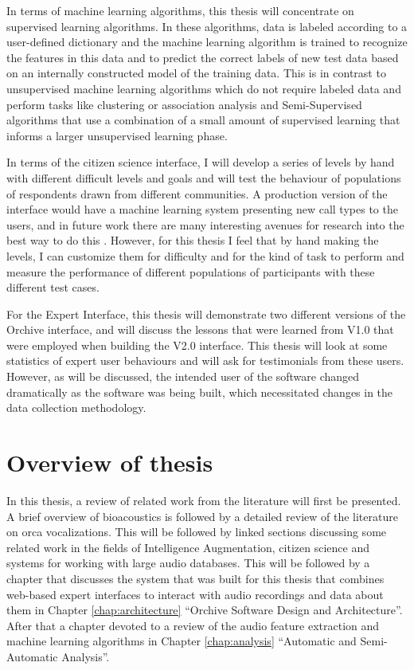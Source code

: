 In terms of machine learning algorithms, this thesis will concentrate
on supervised learning algorithms.  In these algorithms, data is
labeled according to a user-defined dictionary and the machine
learning algorithm is trained to recognize the features in this data
and to predict the correct labels of new test data based on an
internally constructed model of the training data.  This is in
contrast to unsupervised machine learning algorithms which do not
require labeled data and perform tasks like clustering or association
analysis and Semi-Supervised algorithms \cite{chapelle2006} that use a
combination of a small amount of supervised learning that informs a
larger unsupervised learning phase.

In terms of the citizen science interface, I will develop a series of
levels by hand with different difficult levels and goals and will test
the behaviour of populations of respondents drawn from different
communities.  A production version of the interface would have a
machine learning system presenting new call types to the users, and in
future work there are many interesting avenues for research into the
best way to do this \cite{chen2013optimistic}.  However, for this
thesis I feel that by hand making the levels, I can customize them
for difficulty and for the kind of task to perform and measure the
performance of different populations of participants with these
different test cases.

For the Expert Interface, this thesis will demonstrate two different
versions of the Orchive interface, and will discuss the lessons that
were learned from V1.0 that were employed when building the V2.0
interface.  This thesis will look at some statistics of expert user
behaviours and will ask for testimonials from these users.  However,
as will be discussed, the intended user of the software changed
dramatically as the software was being built, which necessitated
changes in the data collection methodology.

\section{Overview of thesis}
\label{section:introduction:overview}

In this thesis, a review of related work from the literature will
first be presented.  A brief overview of bioacoustics is followed by a
detailed review of the literature on orca vocalizations.  This will be
followed by linked sections discussing some related work in the fields
of Intelligence Augmentation, citizen science and systems for working
with large audio databases.  This will be followed by a chapter that
discusses the system that was built for this thesis that combines
web-based expert interfaces to interact with audio recordings and data
about them in Chapter \ref{chap:architecture} ``Orchive Software
Design and Architecture''.  After that a chapter devoted to a review
of the audio feature extraction and machine learning algorithms in
Chapter \ref{chap:analysis} ``Automatic and Semi-Automatic Analysis''.  

